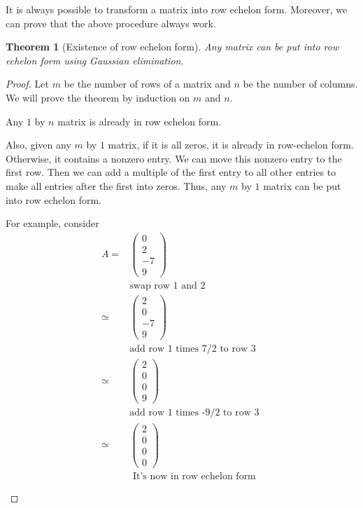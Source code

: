 \documentclass[12pt,reqno]{amsart}
\newtheorem{theorem}{Theorem}[section]
\theoremstyle{definition}
\begin{document}
It is always possible to transform a matrix into row echelon
form. Moreover, we can prove that the above procedure always work.
\begin{theorem}[Existence of row echelon form] \label{thm:ge}
  Any matrix can be put into row echelon form using Gaussian
  elimination. 
\end{theorem}
\begin{proof}
  Let $m$ be the number of rows of a matrix and $n$ be the number of
  columns. We will prove the theorem by induction on $m$ and $n$. 

  Any $1$ by $n$ matrix is already in row echelon form. 

  Also, given any $m$ by $1$ matrix, if it is all zeros, it is already
  in row-echelon form. Otherwise, it contains a nonzero entry. We can
  move this nonzero entry to the first row. Then we can add a multiple
  of the first entry to all other entries to make all entries after
  the first into zeros.  Thus, any $m$ by $1$ matrix can be put into
  row echelon form.
  
  \begin{framed}
    For example, consider 
    \begin{align*}
      A = & \begin{pmatrix} 0 \\ 2 \\ -7 \\ 9  \end{pmatrix} \\
      & \text{swap row 1 and 2 } \\
      \simeq & \begin{pmatrix} 2 \\ 0 \\ -7 \\ 9  \end{pmatrix} \\
      & \text{add row 1 times 7/2 to row 3 } \\
      \simeq & \begin{pmatrix} 2 \\ 0 \\ 0 \\ 9  \end{pmatrix} \\
      & \text{add row 1 times -9/2 to row 3 } \\
      \simeq & \begin{pmatrix} 2 \\ 0 \\ 0 \\ 0  \end{pmatrix} \\
      & \text{ It's now in row echelon form}
    \end{align*}
  \end{framed}
  

\end{proof}
\end{document}
